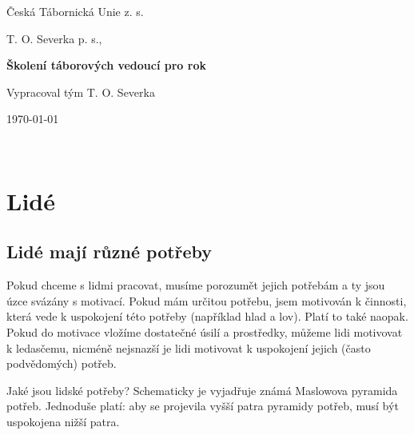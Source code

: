 \documentclass[a4paper,12pt,final]{report}
\begin{document}
\author{Daniel Adámek}
\begin{titlepage}

\mainpagelogo

\centering 
        \Large{Česká Tábornická Unie z. s.}
        \vspace{0.5cm}
        
        \Large{T. O. Severka p. s.,}
        \vspace{7.5cm}
        
        \Huge
        \textbf{Školení táborových vedoucí pro rok \the\year{}}
            
        \vspace{1.5cm}
            
        \large{Vypracoval tým T. O. Severka}
            
        \vfill
        \today

        \vspace{0.8cm}
\end{titlepage}

\pagebreak

\newpage

\

\newpage

\tableofcontents
\pagelogos
\pagebreak

\chapter{Lidé}\pagelogos
\section{Lidé mají různé potřeby}
Pokud chceme s lidmi pracovat, musíme porozumět jejich potřebám a ty jsou úzce svázány s motivací. Pokud mám určitou potřebu, jsem motivován k činnosti, která vede k uspokojení této potřeby (například hlad a lov). Platí to také naopak.
Pokud do motivace vložíme dostatečné úsilí a prostředky, můžeme lidi motivovat k ledasčemu, nicméně nejsnazší je lidi motivovat k uspokojení jejich (často podvědomých) potřeb.

Jaké jsou lidské potřeby? Schematicky je vyjadřuje známá Maslowova pyramida potřeb. Jednoduše platí: aby se projevila vyšší patra pyramidy potřeb, musí být uspokojena nižší patra.
\end{document}
